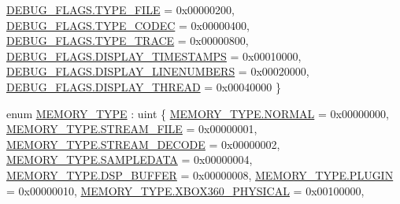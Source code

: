 \begin{DoxyCompactItemize}
\hyperlink{namespace_f_m_o_d_ae26c0e42bca4d9ba2b529ed29cf35b33af681232bc42a9913fc96afc3b25be131}{D\+E\+B\+U\+G\+\_\+\+F\+L\+A\+G\+S.\+T\+Y\+P\+E\+\_\+\+F\+I\+LE} = 0x00000200, 
\hyperlink{namespace_f_m_o_d_ae26c0e42bca4d9ba2b529ed29cf35b33add2aeee15669eb9708e62a1067bd6175}{D\+E\+B\+U\+G\+\_\+\+F\+L\+A\+G\+S.\+T\+Y\+P\+E\+\_\+\+C\+O\+D\+EC} = 0x00000400, 
\hyperlink{namespace_f_m_o_d_ae26c0e42bca4d9ba2b529ed29cf35b33af5658fa023153491c76024e89d32ba84}{D\+E\+B\+U\+G\+\_\+\+F\+L\+A\+G\+S.\+T\+Y\+P\+E\+\_\+\+T\+R\+A\+CE} = 0x00000800, 
\newline
\hyperlink{namespace_f_m_o_d_ae26c0e42bca4d9ba2b529ed29cf35b33a5a9bc4df899986b7b1e40de95c2a6f35}{D\+E\+B\+U\+G\+\_\+\+F\+L\+A\+G\+S.\+D\+I\+S\+P\+L\+A\+Y\+\_\+\+T\+I\+M\+E\+S\+T\+A\+M\+PS} = 0x00010000, 
\hyperlink{namespace_f_m_o_d_ae26c0e42bca4d9ba2b529ed29cf35b33ad178d22c8dadfd6977af3e7362187f80}{D\+E\+B\+U\+G\+\_\+\+F\+L\+A\+G\+S.\+D\+I\+S\+P\+L\+A\+Y\+\_\+\+L\+I\+N\+E\+N\+U\+M\+B\+E\+RS} = 0x00020000, 
\hyperlink{namespace_f_m_o_d_ae26c0e42bca4d9ba2b529ed29cf35b33af71e61209cb1850def9251d3db58b79e}{D\+E\+B\+U\+G\+\_\+\+F\+L\+A\+G\+S.\+D\+I\+S\+P\+L\+A\+Y\+\_\+\+T\+H\+R\+E\+AD} = 0x00040000
 \}
\item 
enum \hyperlink{namespace_f_m_o_d_a3eb4c9654cbf371b668f8eb46358e931}{M\+E\+M\+O\+R\+Y\+\_\+\+T\+Y\+PE} \+: uint \{ \newline
\hyperlink{namespace_f_m_o_d_a3eb4c9654cbf371b668f8eb46358e931a1e23852820b9154316c7c06e2b7ba051}{M\+E\+M\+O\+R\+Y\+\_\+\+T\+Y\+P\+E.\+N\+O\+R\+M\+AL} = 0x00000000, 
\hyperlink{namespace_f_m_o_d_a3eb4c9654cbf371b668f8eb46358e931acc4ba0d773c2a2f1be9a9be573eeaf4e}{M\+E\+M\+O\+R\+Y\+\_\+\+T\+Y\+P\+E.\+S\+T\+R\+E\+A\+M\+\_\+\+F\+I\+LE} = 0x00000001, 
\hyperlink{namespace_f_m_o_d_a3eb4c9654cbf371b668f8eb46358e931a73467c05df5377f9d2fc701041d163c3}{M\+E\+M\+O\+R\+Y\+\_\+\+T\+Y\+P\+E.\+S\+T\+R\+E\+A\+M\+\_\+\+D\+E\+C\+O\+DE} = 0x00000002, 
\hyperlink{namespace_f_m_o_d_a3eb4c9654cbf371b668f8eb46358e931ad38284b693ed8e9cf88618697bfe3bb1}{M\+E\+M\+O\+R\+Y\+\_\+\+T\+Y\+P\+E.\+S\+A\+M\+P\+L\+E\+D\+A\+TA} = 0x00000004, 
\newline
\hyperlink{namespace_f_m_o_d_a3eb4c9654cbf371b668f8eb46358e931a0334ecc5e37a37a5988f38ca780f3d5f}{M\+E\+M\+O\+R\+Y\+\_\+\+T\+Y\+P\+E.\+D\+S\+P\+\_\+\+B\+U\+F\+F\+ER} = 0x00000008, 
\hyperlink{namespace_f_m_o_d_a3eb4c9654cbf371b668f8eb46358e931afd87a731781e74f4c784fa78bd4835b3}{M\+E\+M\+O\+R\+Y\+\_\+\+T\+Y\+P\+E.\+P\+L\+U\+G\+IN} = 0x00000010, 
\hyperlink{namespace_f_m_o_d_a3eb4c9654cbf371b668f8eb46358e931aceebbb09fe3703eb8bb5008c5349557a}{M\+E\+M\+O\+R\+Y\+\_\+\+T\+Y\+P\+E.\+X\+B\+O\+X360\+\_\+\+P\+H\+Y\+S\+I\+C\+AL} = 0x00100000, 

\end{DoxyCompactItemize}

